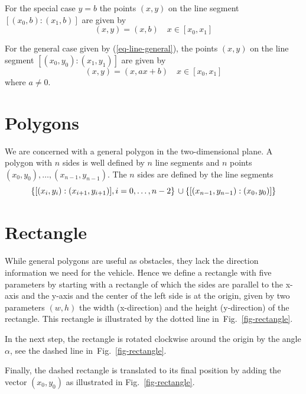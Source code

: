 \documentclass[11pt]{article}
\newcommand{\eqn}[1]{(\ref{#1})}
\newcommand{\figref}[1]{Fig.~\eqref{#1}}
\begin{document}
For the special case $y = b$ the points $(x, y)$ on the line segment
$[(x_0, b):(x_1, b)]$ are given by
\begin{equation}
    (x, y) = (x, b)\quad x\in [x_0, x_1]\label{eq-seg-yb}
\end{equation}

For the general case given by \eqn{eq-line-general}, the points $(x, y)$ on
the line segment $[(x_0, y_0):(x_1, y_1)]$ are given by
\begin{equation}
    (x, y) = (x, ax + b)\quad x\in [x_0, x_1]\label{eq-seg-general}
\end{equation}
where $a\neq 0$.

\section{Polygons}
\label{sec-polygons}

We are concerned with a general polygon in the two-dimensional plane. A polygon
with $n$ sides is well defined by $n$ line segments and $n$ points $(x_0,
y_0),\ldots,(x_{n-1}, y_{n-1})$. The $n$ sides are defined by the line segments
\begin{equation}
    \left\{[(x_i, y_i):(x_{i+1}, y_{i+1})], i=0,\ldots,n-2\right\}\\
\cup\left\{[(x_{n-1}, y_{n-1}):(x_{0}, y_{0})]\right\}
\end{equation}

\section{Rectangle}
\label{sec-rectangle}
While general polygons are useful as obstacles, they lack the direction
information we need for the vehicle.  Hence we define a rectangle with five
parameters by starting with a rectangle of which the sides are parallel to
the x-axis and the y-axis and the center of the left side is at the origin,
given by two parameters $(w, h)$ the width (x-direction) and the height 
(y-direction) of the rectangle. This rectangle is illustrated by the dotted 
line in~\figref{fig-rectangle}.

In the next step, the rectangle is rotated clockwise around the origin by the
angle $\alpha$, see the dashed line in~\figref{fig-rectangle}.

Finally, the dashed rectangle is translated to its final position by adding the
vector $(x_0, y_0)$ as illustrated in \figref{fig-rectangle}.
\end{document}
